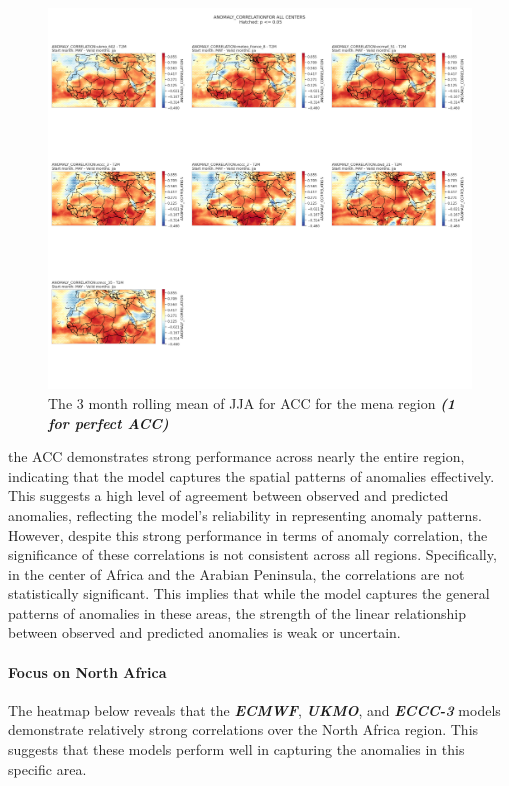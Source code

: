 \begin{figure}[H]
	\centering
	\includegraphics[scale=0.25]{plots/det/acc/ANOMALY_CORRELATION_jja_t2m.png}
	\caption{The 3 month rolling mean of JJA for  ACC for the mena region \textbf{\textit{(1 for perfect ACC)} }}
\end{figure}

the ACC demonstrates strong performance across nearly the entire region, indicating that the model captures the spatial patterns of anomalies effectively. This suggests a high level of agreement between observed and predicted anomalies, reflecting the model's reliability in representing anomaly patterns. However, despite this strong performance in terms of anomaly correlation, the significance of these correlations is not consistent across all regions. Specifically, in the center of Africa and the Arabian Peninsula, the correlations are not statistically significant. This implies that while the model captures the general patterns of anomalies in these areas, the strength of the linear relationship between observed and predicted anomalies is weak or uncertain.

\paragraph{Focus on North Africa}  
The heatmap below reveals that the \textbf{\textit{ECMWF}}, \textbf{\textit{UKMO}}, and \textbf{\textit{ECCC-3}} models demonstrate relatively strong correlations over the North Africa region. This suggests that these models perform well in capturing the anomalies in this specific area.  

